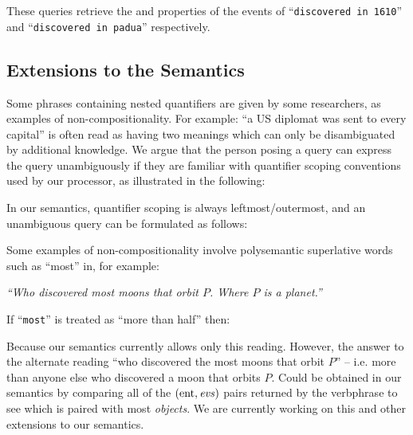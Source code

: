 \documentclass[../main.tex]{subfiles}
\begin{document}
\begin{refsection}

\examplespacing

\noindent These queries retrieve the  and  properties of the events of ``\texttt{discovered in 1610}'' and ``\texttt{discovered in padua}'' respectively.

\subsection{Extensions to the Semantics}
\label{webist2019conf:extend}

Some phrases containing nested quantifiers are given by some researchers, as examples of non-compositionality. For example: ``a US diplomat was sent to every capital'' is often read as having two meanings which can only be disambiguated by additional knowledge. We argue that the person posing a query can express the query unambiguously if they are familiar with quantifier scoping conventions used by our processor, as illustrated in the following:

\examplespacing


\examplespacing

\noindent In our semantics, quantifier scoping is always leftmost/outermost, and an unambiguous query can be formulated as follows:

\examplespacing


\examplespacing

\noindent Some examples of non-compositionality involve polysemantic superlative words such as ``most'' in, for example:
\begin{center}
	\textit{``Who discovered most moons that orbit $P$. Where $P$ is a planet.''}
\end{center}
If ``\texttt{most}'' is treated as ``more than half'' then:

\examplespacing


\examplespacing

\noindent Because our semantics currently allows only this reading. However, the answer to the alternate reading ``who discovered the most moons that orbit $P$'' – i.e. more than anyone else who discovered a moon that orbits $P$. Could be obtained in our semantics by comparing all of the $(\operatorname{ent}, \operatorname{\mathit{evs}})$ pairs returned by the verbphrase to see which  is paired with most \textit{objects}. We are currently working on this and other extensions to our semantics. %


\end{refsection}
\end{document}
